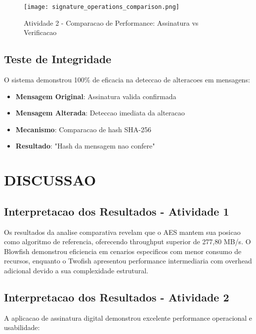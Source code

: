 \documentclass[12pt,a4paper,oneside]{article}
\begin{document}
\begin{figure}[H]
\centering
\texttt{[image: signature\_operations\_comparison.png]}
\caption{Atividade 2 - Comparacao de Performance: Assinatura vs Verificacao}
\label{fig:signature_comparison}
\end{figure}

\subsection{Teste de Integridade}

O sistema demonstrou 100\% de eficacia na deteccao de alteracoes em mensagens:

\begin{itemize}
    \item \textbf{Mensagem Original}: Assinatura valida confirmada
    \item \textbf{Mensagem Alterada}: Deteccao imediata da alteracao
    \item \textbf{Mecanismo}: Comparacao de hash SHA-256
    \item \textbf{Resultado}: "Hash da mensagem nao confere"
\end{itemize}

\section{DISCUSSAO}

\subsection{Interpretacao dos Resultados - Atividade 1}

Os resultados da analise comparativa revelam que o AES mantem sua posicao como algoritmo de referencia, oferecendo throughput superior de 277,80 MB/s. O Blowfish demonstrou eficiencia em cenarios especificos com menor consumo de recursos, enquanto o Twofish apresentou performance intermediaria com overhead adicional devido a sua complexidade estrutural.

\subsection{Interpretacao dos Resultados - Atividade 2}

A aplicacao de assinatura digital demonstrou excelente performance operacional e usabilidade:
\end{document}
